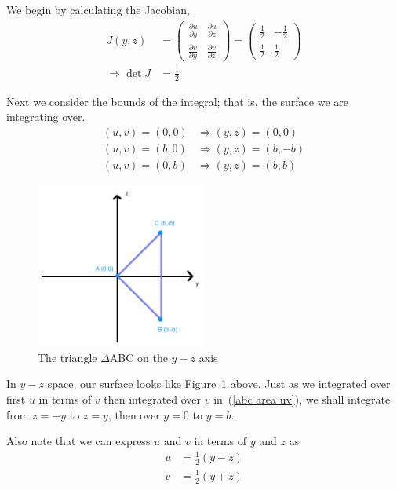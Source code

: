\documentclass[a4paper]{article} %
\newcommand{\pmx}[1]{\begin{pmatrix}#1\end{pmatrix}}
\begin{document}
We begin by calculating the Jacobian,
\begin{align}
J(y,z)&=\pmx{\frac{\partial u}{\partial y}&\frac{\partial u}{\partial z}\\
\frac{\partial v}{\partial y}&\frac{\partial v}{\partial z}}=\pmx{\frac{1}{2}&-\frac{1}{2}\\\frac{1}{2}&\frac{1}{2}}\\
\Rightarrow \det J&=\frac{1}{2}
\end{align}

Next we consider the bounds of the integral; that is, the surface we are integrating over.
\begin{align}
(u,v)=(0,0)&\Rightarrow (y,z)=(0,0)\\
(u,v)=(b,0)&\Rightarrow (y,z)=(b,-b)\\
(u,v)=(0,b)&\Rightarrow (y,z)=(b,b)
\end{align}

\begin{figure}[h]
\centering
\includegraphics[width=0.5\textwidth]{images/fii.png}
\caption{The triangle $\Delta$ABC on the $y-z$ axis}
\label{yz figure}
\end{figure}

In $y-z$ space, our surface looks like Figure~\ref{yz figure} above. Just as we integrated over first $u$ in terms of $v$ then integrated over $v$ in~(\ref{abc area uv}), we shall integrate from $z=-y$ to $z=y$, then over $y=0$ to $y=b$.

Also note that we can express $u$ and $v$ in terms of $y$ and $z$ as
\begin{align}
u&=\frac{1}{2}(y-z)\\
v&=\frac{1}{2}(y+z)
\end{align}
\end{document}
